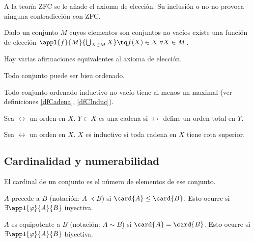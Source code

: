 \documentclass[nochap]{apuntes}
\begin{document}
A la teoría ZFC se le añade el axioma de elección. Su inclusión o no no provoca ninguna contradicción con ZFC.

\begin{defn}
Dado un conjunto $M$ cuyos elementos son conjuntos no vacíos existe una función de elección $\appl{f}{M}{\bigcup_{X\in M}X} \tq f(X)\in X \;\forall X\in M$.
\end{defn}

Hay varias afirmaciones equivalentes al axioma de elección.

\begin{theorem}
Todo conjunto puede ser bien ordenado.
\end{theorem}

\begin{lemma}
Todo conjunto ordenado inductivo no vacío tiene al menos un maximal (ver definiciones \ref{dfCadena}, \ref{dfCInduc}).
\end{lemma}

\begin{defn}[Cadena]\label{dfCadena}
Sea $\rel$ un orden en $X$. $Y\subset X$ es una cadena si $\rel$ define un orden total en $Y$.
\end{defn}

\begin{defn}\label{dfCInduc}
Sea $\rel$ un orden en $X$. $X$ es inductivo si toda cadena en $X$ tiene cota superior.
\end{defn}

\subsection{Cardinalidad y numerabilidad}

\begin{defn}[Cardinal] El cardinal de un conjunto es el número de elementos de ese conjunto.\end{defn}

\begin{defn}[Precedencia] $A$ precede a $B$ (notación: $A \prec B$) si $\card{A} \leq \card{B}$. Esto ocurre si $\exists \appl{\varphi }{A}{B}$ inyectiva.\end{defn}

\begin{defn}[Equipotencia] $A$ es equipotente a $B$ (notación: $A \sim B$) si $\card{A} = \card{B}$. Esto ocurre si $\exists  \appl{\varphi }{A}{B}$ biyectiva.
\end{defn}
\end{document}

